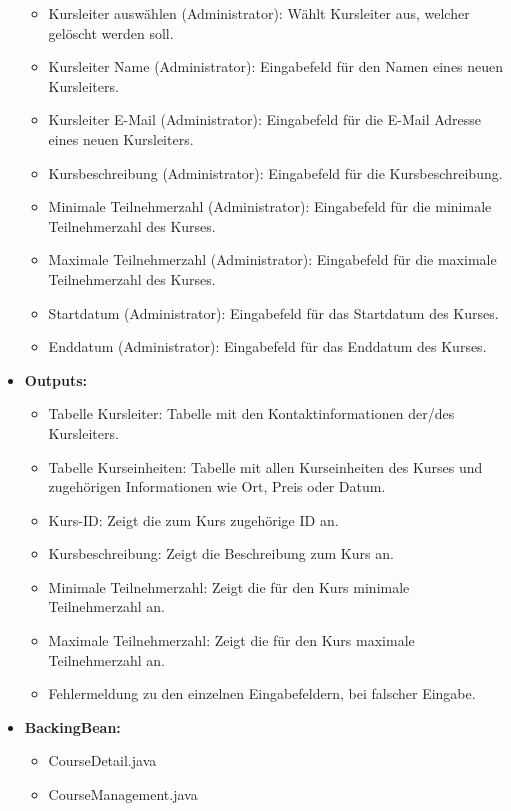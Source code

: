 \begin{itemize}
\begin{itemize}
								\item Kursleiter auswählen (Administrator): Wählt Kursleiter aus, welcher gelöscht werden soll.
								\item Kursleiter Name (Administrator): Eingabefeld für den Namen eines neuen Kursleiters.
								\item Kursleiter E-Mail (Administrator): Eingabefeld für die E-Mail Adresse eines neuen Kursleiters.
								\item Kursbeschreibung (Administrator): Eingabefeld für die Kursbeschreibung.
								\item Minimale Teilnehmerzahl (Administrator): Eingabefeld für die minimale Teilnehmerzahl des Kurses.
								\item Maximale Teilnehmerzahl (Administrator): Eingabefeld für die maximale Teilnehmerzahl des Kurses.
								\item Startdatum (Administrator): Eingabefeld für das Startdatum des Kurses.
								\item Enddatum (Administrator): Eingabefeld für das Enddatum des Kurses.
							\end{itemize}
						\item \textbf{Outputs:}
							\begin{itemize}
								\item Tabelle Kursleiter: Tabelle mit den Kontaktinformationen der/des Kursleiters.
								\item Tabelle Kurseinheiten: Tabelle mit allen Kurseinheiten des Kurses und zugehörigen Informationen wie Ort, Preis oder Datum.
								\item Kurs-ID: Zeigt die zum Kurs zugehörige ID an.
								\item Kursbeschreibung: Zeigt die Beschreibung zum Kurs an.
								\item Minimale Teilnehmerzahl: Zeigt die für den Kurs minimale Teilnehmerzahl an.
								\item Maximale Teilnehmerzahl: Zeigt die für den Kurs maximale Teilnehmerzahl an.
								\item Fehlermeldung zu den einzelnen Eingabefeldern, bei falscher Eingabe.
							\end{itemize}
						\item \textbf{BackingBean:}
							\begin{itemize}
								\item CourseDetail.java
								\item CourseManagement.java
							\end{itemize}
					\end{itemize}
		
